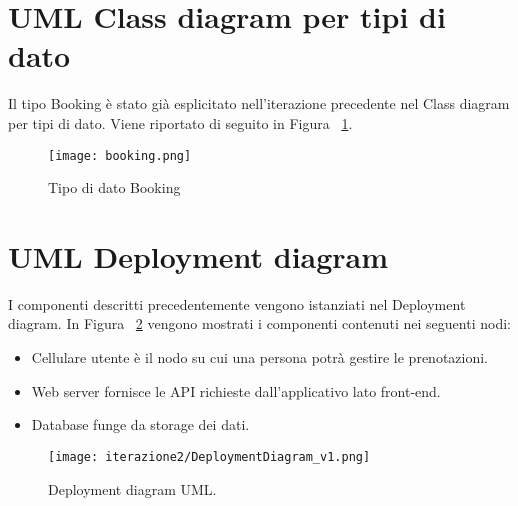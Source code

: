 \section{UML Class diagram per tipi di dato}
Il tipo Booking è stato già esplicitato nell'iterazione precedente nel Class diagram per tipi di dato.
Viene riportato di seguito in Figura ~\ref{fig:BookingType}.

\begin{figure}[htbp]
    \texttt{[image: booking.png]}
    \centering
    \caption{Tipo di dato Booking}\label{fig:BookingType}
\end{figure}

\section{UML Deployment diagram}
I componenti descritti precedentemente vengono istanziati nel Deployment diagram.
In Figura ~\ref{fig:DeploymentDiagram2} vengono mostrati i componenti contenuti nei seguenti nodi:
\begin{itemize}
    \item Cellulare utente è il nodo su cui una persona potrà gestire le prenotazioni.
    \item Web server fornisce le API richieste dall’applicativo lato front-end.
    \item Database funge da storage dei dati.
\end{itemize}

\begin{figure}[htbp]
    \texttt{[image: iterazione2/DeploymentDiagram\_v1.png]}
    \centering
    \caption{Deployment diagram UML.}\label{fig:DeploymentDiagram2}
\end{figure}